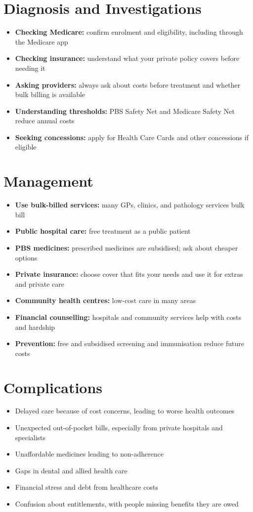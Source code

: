 \section*{Diagnosis and Investigations}
\begin{itemize}
    \item \textbf{Checking Medicare:} confirm enrolment and eligibility, including through the Medicare app
    \item \textbf{Checking insurance:} understand what your private policy covers before needing it
    \item \textbf{Asking providers:} always ask about costs before treatment and whether bulk billing is available
    \item \textbf{Understanding thresholds:} PBS Safety Net and Medicare Safety Net reduce annual costs
    \item \textbf{Seeking concessions:} apply for Health Care Cards and other concessions if eligible
\end{itemize}

\section*{Management}
\begin{itemize}
    \item \textbf{Use bulk-billed services:} many GPs, clinics, and pathology services bulk bill
    \item \textbf{Public hospital care:} free treatment as a public patient
    \item \textbf{PBS medicines:} prescribed medicines are subsidised; ask about cheaper options
    \item \textbf{Private insurance:} choose cover that fits your needs and use it for extras and private care
    \item \textbf{Community health centres:} low-cost care in many areas
    \item \textbf{Financial counselling:} hospitals and community services help with costs and hardship
    \item \textbf{Prevention:} free and subsidised screening and immunisation reduce future costs
\end{itemize}

\section*{Complications}
\begin{itemize}
    \item Delayed care because of cost concerns, leading to worse health outcomes
    \item Unexpected out-of-pocket bills, especially from private hospitals and specialists
    \item Unaffordable medicines leading to non-adherence
    \item Gaps in dental and allied health care
    \item Financial stress and debt from healthcare costs
    \item Confusion about entitlements, with people missing benefits they are owed
\end{itemize}

